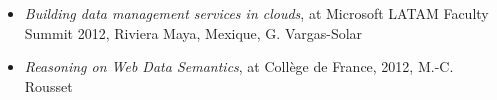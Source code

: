 \begin{itemize}








\item \emph{ Building data management services in clouds}, at Microsoft LATAM Faculty Summit 2012, Riviera Maya, Mexique, G. Vargas-Solar	

\item \emph{Reasoning on Web Data Semantics}, at Coll{\`e}ge de France, 2012, M.-C. Rousset



\end{itemize}
